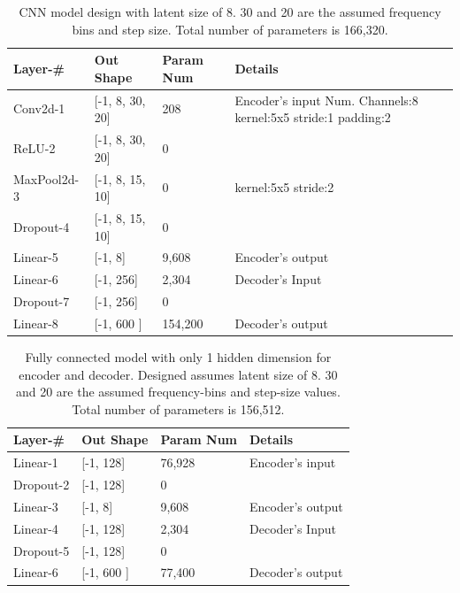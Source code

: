 \documentclass[\main/thesis.tex]{subfiles}
\begin{document}
\begin{table}[[h]
\begin{tabular}{|p{28mm}|p{25mm}|p{23mm}|p{50mm}|}
\hline
Layer-\# & Out Shape & Param Num & Details  \\ \hline
Conv2d-1 & [-1, 8, 30, 20] &   208 & Encoder's input \newline
Num. Channels:8\newline
kernel:5x5\newline                  
stride:1\newline    
padding:2 \\ \hline
ReLU-2 & [-1, 8, 30, 20] &   0 & \\  \hline
MaxPool2d-3 & [-1, 8, 15, 10] & 0 &  kernel:5x5 \newline
stride:2 \\ \hline
Dropout-4 & [-1, 8, 15, 10] & 0 &  \\ \hline
Linear-5 & [-1, 8] & 9,608 & Encoder's output \\ \hline
Linear-6 & [-1, 256] & 2,304 & Decoder's Input \\ \hline
Dropout-7 & [-1, 256] & 0 &  \\ \hline
Linear-8 & [-1, 600 ] &  154,200& Decoder's output\\ \hline
\end{tabular}
\caption{CNN model design with latent size of 8. 30 and 20 are the assumed frequency bins and step size. Total number of parameters is 166,320. }
\label{table:CNNAUTOENCODER}
\end{table}

\begin{table}[[h]
\begin{tabular}{|p{28mm}|p{25mm}|p{23mm}|p{50mm}|}
\hline
Layer-\# & Out Shape & Param Num & Details  \\ \hline
Linear-1 & [-1, 128]  & 76,928 & Encoder's input \\ \hline
Dropout-2 & [-1, 128] & 0 &  \\ \hline
Linear-3 & [-1, 8] & 9,608 & Encoder's output \\ \hline
Linear-4 & [-1, 128] & 2,304 & Decoder's Input \\ \hline
Dropout-5 & [-1, 128]  & 0 &  \\ \hline
Linear-6  & [-1, 600 ] &  77,400 &Decoder's output\\ \hline
\end{tabular}
\caption{Fully connected model with only 1 hidden dimension for encoder and decoder. Designed assumes latent size of 8. 30 and 20 are the assumed frequency-bins and step-size values. Total number of parameters is 156,512.}
\label{table:FC1_AUTOENCODER}
\end{table}
\end{document}
